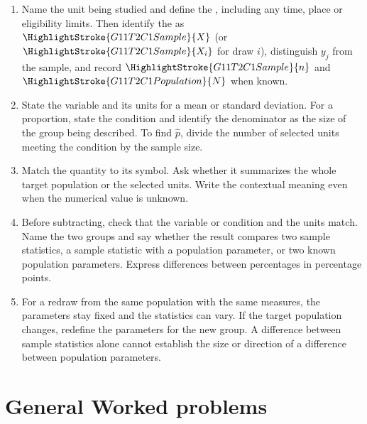 	\begin{enumerate}
		\item Name the unit being studied and define the , including any time, place or eligibility limits. Then identify the  as $\HighlightStroke{G11T2C1Sample}{X}$ (or $\HighlightStroke{G11T2C1Sample}{X_i}$ for draw $i$), distinguish $y_j$ from the sample, and record $\HighlightStroke{G11T2C1Sample}{n}$ and $\HighlightStroke{G11T2C1Population}{N}$ when known.
		\item State the variable and its units for a mean or standard deviation. For a proportion, state the condition and identify the denominator as the size of the group being described. To find $\hat{p}$, divide the number of selected units meeting the condition by the sample size.
		\item Match the quantity to its symbol. Ask whether it summarizes the whole target population or the selected units. Write the contextual meaning even when the numerical value is unknown.
		\item Before subtracting, check that the variable or condition and the units match. Name the two groups and say whether the result compares two sample statistics, a sample statistic with a population parameter, or two known population parameters. Express differences between percentages in percentage points.
		\item For a redraw from the same population with the same measures, the parameters stay fixed and the statistics can vary. If the target population changes, redefine the parameters for the new group. A difference between sample statistics alone cannot establish the size or direction of a difference between population parameters.
	\end{enumerate}


	
	\section{General Worked problems}
	\label{sec:worked-solution-examples}


